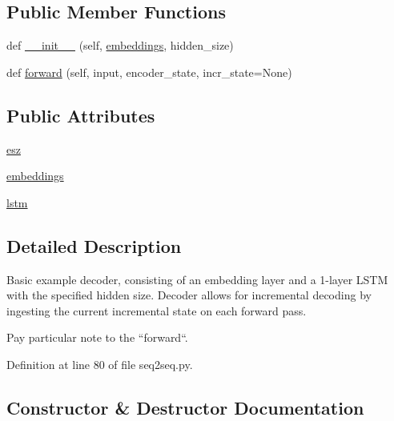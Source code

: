 \subsection*{Public Member Functions}
\begin{DoxyCompactItemize}
\item 
def \hyperlink{classparlai_1_1agents_1_1examples_1_1seq2seq_1_1Decoder_a8d3cde9bfc1341ecf32de4957284a3db}{\+\_\+\+\_\+init\+\_\+\+\_\+} (self, \hyperlink{classparlai_1_1agents_1_1examples_1_1seq2seq_1_1Decoder_aa0bc6e18f86e036101771cfe9c88a228}{embeddings}, hidden\+\_\+size)
\item 
def \hyperlink{classparlai_1_1agents_1_1examples_1_1seq2seq_1_1Decoder_a21c8ac2081cfc42ca7823f6640f40855}{forward} (self, input, encoder\+\_\+state, incr\+\_\+state=None)
\end{DoxyCompactItemize}
\subsection*{Public Attributes}
\begin{DoxyCompactItemize}
\item 
\hyperlink{classparlai_1_1agents_1_1examples_1_1seq2seq_1_1Decoder_a595779e6e60479d413ebe8ca7f643182}{esz}
\item 
\hyperlink{classparlai_1_1agents_1_1examples_1_1seq2seq_1_1Decoder_aa0bc6e18f86e036101771cfe9c88a228}{embeddings}
\item 
\hyperlink{classparlai_1_1agents_1_1examples_1_1seq2seq_1_1Decoder_a1a90e93b199377e14872451abfd67bd9}{lstm}
\end{DoxyCompactItemize}


\subsection{Detailed Description}
\begin{DoxyVerb}Basic example decoder, consisting of an embedding layer and a 1-layer LSTM with the
specified hidden size. Decoder allows for incremental decoding by ingesting the
current incremental state on each forward pass.

Pay particular note to the ``forward``.
\end{DoxyVerb}
 

Definition at line 80 of file seq2seq.\+py.



\subsection{Constructor \& Destructor Documentation}
\mbox{\label{classparlai_1_1agents_1_1examples_1_1seq2seq_1_1Decoder_a8d3cde9bfc1341ecf32de4957284a3db}} 
